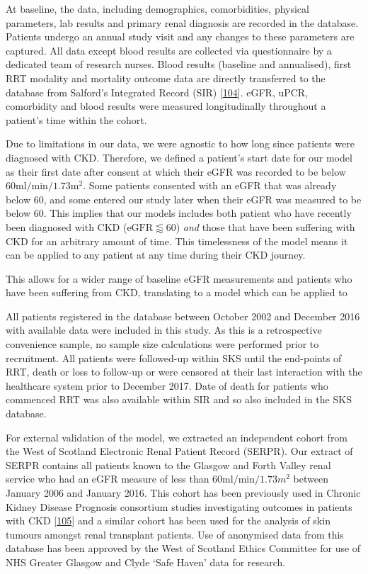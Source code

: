 \documentclass[12pt,PhD,twoside,openright]{muthesis}
\begin{document}
At baseline, the data, including demographics, comorbidities, physical parameters, lab results and primary renal diagnosis are recorded in the database. Patients undergo an annual study visit and any changes to these parameters are captured. All data except blood results are collected via questionnaire by a dedicated team of research nurses. Blood results (baseline and annualised), first RRT modality and mortality outcome data are directly transferred to the database from Salford's Integrated Record (SIR) {[}\protect\hyperlink{ref-new_obtaining_2014}{104}{]}. eGFR, uPCR, comorbidity and blood results were measured longitudinally throughout a patient's time within the cohort.

Due to limitations in our data, we were agnostic to how long since patients were diagnosed with CKD. Therefore, we defined a patient's start date for our model as their first date after consent at which their eGFR was recorded to be below \(60\textrm{ml}/\textrm{min}/1.73\textrm{m}^2\). Some patients consented with an eGFR that was already below 60, and some entered our study later when their eGFR was measured to be below 60. This implies that our models includes both patient who have recently been diagnosed with CKD (\(\textrm{eGFR} \lessapprox 60\)) \emph{and} those that have been suffering with CKD for an arbitrary amount of time. This timelessness of the model means it can be applied to any patient at any time during their CKD journey.

This allows for a wider range of baseline eGFR measurements and patients who have been suffering from CKD, translating to a model which can be applied to

All patients registered in the database between October 2002 and December 2016 with available data were included in this study. As this is a retrospective convenience sample, no sample size calculations were performed prior to recruitment. All patients were followed-up within SKS until the end-points of RRT, death or loss to follow-up or were censored at their last interaction with the healthcare system prior to December 2017. Date of death for patients who commenced RRT was also available within SIR and so also included in the SKS database.

For external validation of the model, we extracted an independent cohort from the West of Scotland Electronic Renal Patient Record (SERPR). Our extract of SERPR contains all patients known to the Glasgow and Forth Valley renal service who had an eGFR measure of less than \(60\textrm{ml}/\textrm{min}/1.73m^2\) between January 2006 and January 2016. This cohort has been previously used in Chronic Kidney Disease Prognosis consortium studies investigating outcomes in patients with CKD {[}\protect\hyperlink{ref-matsushita_cohort_2013}{105}{]} and a similar cohort has been used for the analysis of skin tumours amongst renal transplant patients. Use of anonymised data from this database has been approved by the West of Scotland Ethics Committee for use of NHS Greater Glasgow and Clyde `Safe Haven' data for research.
\end{document}

